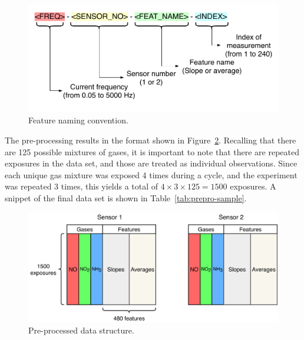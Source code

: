 \begin{figure}[h]
	\centering
	\includegraphics[width=1\textwidth]{../figures/feat-naming.pdf}
	\caption{Feature naming convention.}
	\label{fig:feat-naming}
\end{figure}

The pre-processing results in the format shown in Figure~\ref{fig:preprocessed-data}. Recalling that there are 125 possible mixtures of gases, it is important to note that there are repeated exposures in the data set, and those are treated as individual observations. Since each unique gas mixture was exposed 4 times during a cycle, and the experiment was repeated 3 times, this yields a total of $4 \times 3 \times 125 = 1500$ exposures. A snippet of the final data set is shown in Table~\ref{tab:prepro-sample}.

\begin{figure}[h]
	\centering
	\includegraphics[width=1\textwidth]{../figures/preprocessed-data.pdf}
	\caption{Pre-processed data structure.}
	\label{fig:preprocessed-data}
\end{figure}

